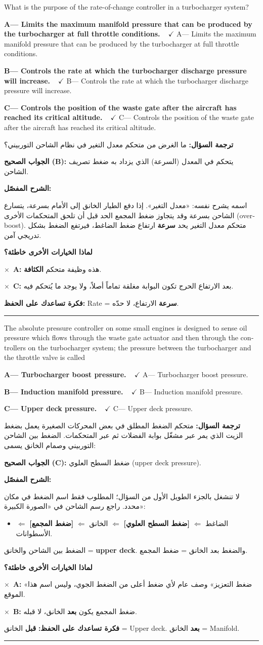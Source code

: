 \documentclass[11pt,a4paper]{article}
\newcommand{\en}[1]{\textenglish{#1}}
\newcommand{\correctletter}{}
\newcommand{\opt}[2]{%
  \ifdefstring{\correctletter}{#1}%
    {\textcolor{ansgreen}{\textbf{#1— #2\ \ $\checkmark$}}}%
    {#1— #2}\par}
\newcommand{\Q}[6]{%
  \renewcommand{\correctletter}{#6}%
  \par\bigskip
  \phantomsection\label{q#1}%
  \begin{tcolorbox}[enhanced,breakable,colback=qback,colframe=qframe,
      arc=2mm,boxrule=0.8pt,fonttitle=\bfseries,
      title={\en{Question #1}}]
    \begin{english}
      #2\par\smallskip
      \opt{A}{#3}\opt{B}{#4}\opt{C}{#5}
    \end{english}
  \end{tcolorbox}}
\newcommand{\tr}[1]{\textbf{\textcolor{qframe}{ترجمة السؤال:}} #1\par}
\newcommand{\ans}[2]{%
  \begin{tcolorbox}[colback=ansback,colframe=ansgreen,boxrule=0.6pt,arc=1.5mm,
      left=4pt,right=4pt,top=2pt,bottom=2pt]
    \textbf{\textcolor{ansgreen}{الجواب الصحيح (\en{#1}):}} #2
  \end{tcolorbox}}
\newcommand{\sharh}[1]{\textbf{\textcolor{conceptc}{الشرح المفصّل:}}\par #1\par}
\newcommand{\nohead}{\textbf{\textcolor{wrongc}{لماذا الخيارات الأخرى خاطئة؟}}\par}
\newcommand{\no}[2]{\hspace*{1em}\textcolor{wrongc}{$\times$}\ \textbf{\en{#1}:} #2\par}
\newcommand{\tip}[1]{%
  \begin{tcolorbox}[colback=tipback,colframe=tipframe,boxrule=0.5pt,arc=1.5mm,
      left=4pt,right=4pt,top=2pt,bottom=2pt]
    \textbf{فكرة تساعدك على الحفظ:} #1
  \end{tcolorbox}}
\newcommand{\qsep}{\par\medskip\noindent\textcolor{qframe!40}{\rule{\linewidth}{0.4pt}}\par}
\begin{document}
\Q{8789}{What is the purpose of the rate-of-change controller in a turbocharger system?}
{Limits the maximum manifold pressure that can be produced by the turbocharger at full throttle conditions.}
{Controls the rate at which the turbocharger discharge pressure will increase.}
{Controls the position of the waste gate after the aircraft has reached its critical altitude.}{B}
\tr{ما الغرض من متحكم معدل التغير في نظام الشاحن التوربيني؟}
\ans{B}{يتحكم في المعدل (السرعة) الذي يزداد به ضغط تصريف الشاحن.}
\sharh{اسمه يشرح نفسه: «معدل التغير». إذا دفع الطيار الخانق إلى الأمام بسرعة، يتسارع الشاحن بسرعة وقد يتجاوز ضغط المجمع الحد قبل أن تلحق المتحكمات الأخرى (\en{overboost}). متحكم معدل التغير يحد \textbf{سرعة} ارتفاع ضغط الضاغط، فيرتفع الضغط بشكل تدريجي آمن.}
\nohead
\no{A}{هذه وظيفة متحكم \textbf{الكثافة}.}
\no{C}{بعد الارتفاع الحرج تكون البوابة مغلقة تماماً أصلاً، ولا يوجد ما يُتحكم فيه.}
\tip{\en{Rate} = \textbf{سرعة} الارتفاع، لا حدّه.}
\qsep

\Q{8793-1}{The absolute pressure controller on some small engines is designed to sense oil pressure which flows through the waste gate actuator and then through the controllers on the turbocharger system; the pressure between the turbocharger and the throttle valve is called}
{Turbocharger boost pressure.}
{Induction manifold pressure.}
{Upper deck pressure.}{C}
\tr{متحكم الضغط المطلق في بعض المحركات الصغيرة يعمل بضغط الزيت الذي يمر عبر مشغّل بوابة الفضلات ثم عبر المتحكمات. الضغط بين الشاحن التوربيني وصمام الخانق يسمى:}
\ans{C}{ضغط السطح العلوي (\en{upper deck pressure}).}
\sharh{لا تنشغل بالجزء الطويل الأول من السؤال؛ المطلوب فقط اسم الضغط في مكان محدد. راجع رسم الشاحن في «الصورة الكبيرة»:
\begin{itemize}
  \item الضاغط $\Leftarrow$ \textbf{[ضغط السطح العلوي]} $\Leftarrow$ الخانق $\Leftarrow$ \textbf{[ضغط المجمع]} $\Leftarrow$ الأسطوانات.
\end{itemize}
الضغط بين الشاحن والخانق = \textbf{\en{upper deck}}. والضغط بعد الخانق = ضغط المجمع.}
\nohead
\no{A}{«ضغط التعزيز» وصف عام لأي ضغط أعلى من الضغط الجوي، وليس اسم هذا الموقع.}
\no{B}{ضغط المجمع يكون \textbf{بعد} الخانق، لا قبله.}
\tip{\textbf{قبل} الخانق = \en{Upper deck}. \textbf{بعد} الخانق = \en{Manifold}.}
\qsep
\end{document}

